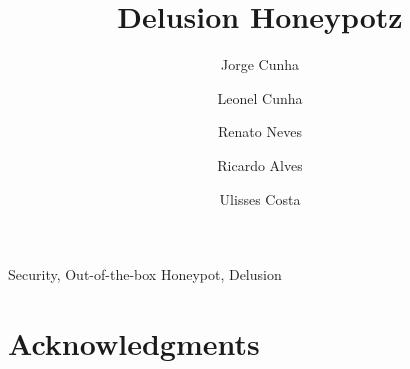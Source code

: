 \documentclass[citeauthoryear]{llncs}
\title{Delusion Honeypotz}
\author{Jorge Cunha \and Leonel Cunha \and Renato Neves \and Ricardo Alves \and Ulisses Costa}
\institute{Department of Informatics, University of Minho\\ Visionspace Technologies}
\begin{document}
\maketitle



\keywords Security, Out-of-the-box Honeypot, Delusion













\section*{Acknowledgments}


\end{document}
